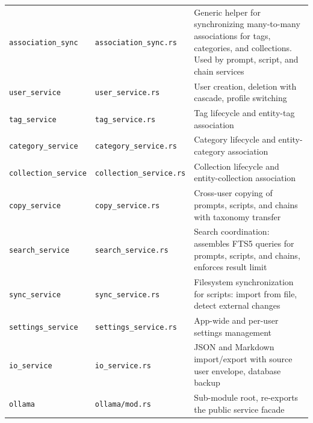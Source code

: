 \documentclass[a4paper, 11pt, oneside]{report}
\begin{document}
{\begin{longtable}{L{4cm} L{4.8cm} L{5.8cm}}
  \texttt{association\_sync} & \texttt{association\_sync.rs}& Generic helper for synchronizing
                                                             many-to-many associations for tags,
                                                             categories, and collections.  Used by
                                                             prompt, script, and chain services \\
  \texttt{user\_service}     & \texttt{user\_service.rs}   & User creation, deletion with cascade,
                                                             profile switching \\
  \texttt{tag\_service}      & \texttt{tag\_service.rs}    & Tag lifecycle and entity-tag association \\
  \texttt{category\_service} & \texttt{category\_service.rs} & Category lifecycle and entity-category
                                                                association \\
  \texttt{collection\_service} & \texttt{collection\_service.rs} & Collection lifecycle and
                                                                    entity-collection association \\
  \texttt{copy\_service}     & \texttt{copy\_service.rs}   & Cross-user copying of prompts, scripts,
                                                             and chains with taxonomy transfer \\
  \texttt{search\_service}   & \texttt{search\_service.rs} & Search coordination: assembles FTS5
                                                              queries for prompts, scripts, and chains,
                                                              enforces result limit \\
  \texttt{sync\_service}     & \texttt{sync\_service.rs}   & Filesystem synchronization for scripts:
                                                              import from file, detect external changes \\
  \texttt{settings\_service} & \texttt{settings\_service.rs} & App-wide and per-user settings management \\
  \texttt{io\_service}       & \texttt{io\_service.rs}     & JSON and Markdown import/export with source
                                                                user envelope, database backup \\
  \texttt{ollama}            & \texttt{ollama/mod.rs}       & Sub-module root, re-exports the public
                                                             service facade \\

\end{longtable}}
\end{document}
